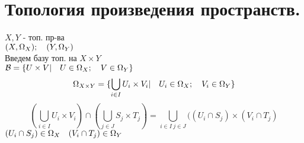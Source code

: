 \documentclass[geometry.tex]{subfiles}
\begin{document}
  \section{Топология произведения пространств.}

  \begin{example} [- конструкция]
      $X, Y$ - топ. пр-ва\\
      $(X, \Omega_X); \quad (Y, \Omega_Y)$ \\
      Введем базу топ. на $X \times Y$\\
      $\mathcal{B} = \{U \times V | \quad U \in \Omega_X; \quad V \in \Omega_Y\}$\\
      \[\Omega_{X \times Y} = \{\bigcup_{i \in I} U_i \times V_i | \quad U_i \in \Omega_X; \quad V_i \in \Omega_Y\}\]
      \[(\bigcup_{i \in I} U_i \times V_i) \cap (\bigcup_{j \in J} S_j \times T_j) =
      \bigcup_{i \in I \  j  \in J} ((U_i \cap S_j) \times (V_i \cap T_j)\]
      $(U_i \cap S_j) \in \Omega_X \quad (V_i \cap T_j) \in \Omega_Y$
  \end{example}
\end{document}
